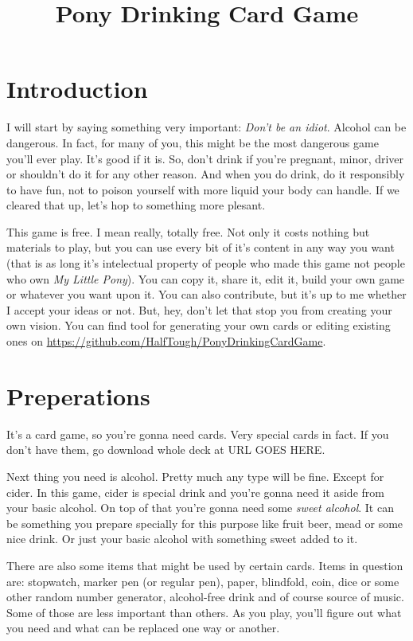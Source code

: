 \documentclass[notitlepage]{article}
\title{Pony Drinking Card Game}
\begin{document}
\maketitle
\section{Introduction}
I will start by saying something very important: \textsl{Don't be an idiot}. Alcohol can be dangerous. In fact, for many of you, this might be the most dangerous game you'll ever play. It's good if it is. So, don't drink if you're pregnant, minor, driver or shouldn't do it for any other reason. And when you do drink, do it responsibly to have fun, not to poison yourself with more liquid your body can handle. If we cleared that up, let's hop to something more plesant.

This game is free. I mean really, totally free. Not only it costs nothing but materials to play, but you can use every bit of it's content in any way you want (that is as long it's intelectual property of people who made this game not people who own \textsl{My Little Pony}). You can copy it, share it, edit it, build your own game or whatever you want upon it. You can also contribute, but it's up to me whether I accept your ideas or not. But, hey, don't let that stop you from creating your own vision. You can find tool for generating your own cards or editing existing ones on \url{https://github.com/HalfTough/PonyDrinkingCardGame}.

\section{Preperations}
It's a card game, so you're gonna need cards. Very special cards in fact. If you don't have them, go download whole deck at URL GOES HERE.

Next thing you need is alcohol. Pretty much any type will be fine. Except for cider. In this game, cider is special drink and you're gonna need it aside from your basic alcohol. On top of that you're gonna need some \textsl{sweet alcohol}. It can be something you prepare specially for this purpose like fruit beer, mead or some nice drink. Or just your basic alcohol with something sweet added to it.

There are also some items that might be used by certain cards. Items in question are: stopwatch, marker pen (or regular pen), paper, blindfold, coin, dice or some other random number generator, alcohol-free drink and of course source of music. Some of those are less important than others. As you play, you'll figure out what you need and what can be replaced one way or another.
\end{document}
